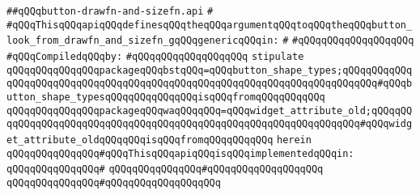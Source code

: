 \label{src/lib/x-kit/widget/old/leaf/button-drawfn-and-sizefn.api}
\verb|##qQQqbutton-drawfn-and-sizefn.api|\newline
\verb|#|\newline
\verb|#qQQqThisqQQqapiqQQqdefinesqQQqtheqQQqargumentqQQqtoqQQqtheqQQqbutton_look_from_drawfn_and_sizefn_gqQQqgenericqQQqin:|\newline
\verb|#|\newline
\verb|#qQQqqQQqqQQqqQQqqQQq|\newline
\newline
\verb|#qQQqCompiledqQQqby:|\newline
\verb|#qQQqqQQqqQQqqQQqqQQq|\newline
\newline
\newline
\verb|stipulate|\newline
\verb|qQQqqQQqqQQqqQQqpackageqQQqbstqQQq=qQQqbutton_shape_types;qQQqqQQqqQQqqQQqqQQqqQQqqQQqqQQqqQQqqQQqqQQqqQQqqQQqqQQqqQQqqQQqqQQqqQQqqQQq#qQQqbutton_shape_typesqQQqqQQqqQQqqQQqisqQQqfromqQQqqQQqqQQq|\newline
\verb|qQQqqQQqqQQqqQQqpackageqQQqwaqQQqqQQq=qQQqwidget_attribute_old;qQQqqQQqqQQqqQQqqQQqqQQqqQQqqQQqqQQqqQQqqQQqqQQqqQQqqQQqqQQqqQQqqQQq#qQQqwidget_attribute_oldqQQqqQQqisqQQqfromqQQqqQQqqQQq|\newline
\verb|herein|\newline
\newline
\verb|qQQqqQQqqQQqqQQq#qQQqThisqQQqapiqQQqisqQQqimplementedqQQqin:|\newline
\verb|qQQqqQQqqQQqqQQq#|\newline
\verb|qQQqqQQqqQQqqQQq#qQQqqQQqqQQqqQQqqQQq|\newline
\verb|qQQqqQQqqQQqqQQq#qQQqqQQqqQQqqQQqqQQq|\newline
